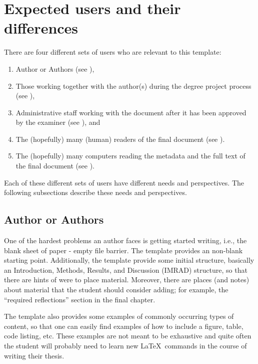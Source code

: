 \documentclass{article}
\begin{document}
\section{Expected users and their differences}
\label{sec:expectedUsers}
There are four different sets of users who are relevant to this template:
\begin{enumerate}[leftmargin=*,label=\textbf{Users \arabic*}, ref={Users \arabic*}]
    \item \label{users:authors} Author or Authors (see ),
    \item \label{users:others} Those working together with the author(s) during the degree project process (see ),
    \item \label{users:admins} Administrative staff working with the document after it has been approved by the examiner (see ), and
    \item \label{users:readers} The (hopefully) many (human) readers of the final document (see ).
    \item \label{users:searchEngines} The (hopefully) many computers reading the metadata and the full text of the final document (see ).
\end{enumerate}

Each of these different sets of users have different needs and perspectives. The following subsections describe these needs and perspectives.

\subsection{Author or Authors}
\label{sec:authors}
One of the hardest problems an author faces is getting started writing, i.e., the blank sheet of paper - empty file barrier. The template provides an \mbox{non-blank} starting point. Additionally, the template provide some initial structure, basically an  Introduction, Methods, Results, and Discussion (IMRAD) structure, so that there are hints of were to place material. Moreover, there are places (and notes) about material that the student should consider adding; for example, the ``required reflections'' section in the final chapter.

The template also provides some examples of commonly occurring types of content, so that one can easily find examples of how to include a figure, table, code listing, etc. These examples are not meant to be exhaustive and quite often the student will probably need to learn new \LaTeX\ commands in the course of writing their thesis.
\end{document}
